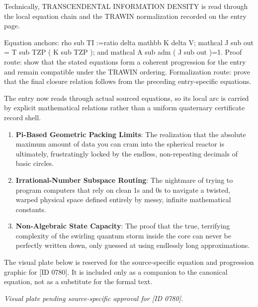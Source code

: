 Technically, TRANSCENDENTAL INFORMATION DENSITY is read through the local equation chain and the TRAWIN normalization recorded on the entry page.

Equation anchors: rho sub TI :=ratio delta mathbb K delta V; mathcal J sub out = T sub TZP ( K sub TZP ); and mathcal A sub adm ( J sub out )=1. Proof route: show that the stated equations form a coherent progression for the entry and remain compatible under the TRAWIN ordering. Formalization route: prove that the final closure relation follows from the preceding entry-specific equations.

The entry now reads through actual sourced equations, so its local arc is carried by explicit mathematical relations rather than a uniform quaternary certificate record shell.
\endgroup

\begin{enumerate}[leftmargin=1.6em,itemsep=6pt,topsep=4pt]
\item \textbf{Pi-Based Geometric Packing Limits}: The realization that the absolute maximum amount of data you can cram into the spherical reactor is ultimately, frustratingly locked by the endless, non-repeating decimals of basic circles.
\item \textbf{Irrational-Number Subspace Routing}: The nightmare of trying to program computers that rely on clean 1s and 0s to navigate a twisted, warped physical space defined entirely by messy, infinite mathematical constants.
\item \textbf{Non-Algebraic State Capacity}: The proof that the true, terrifying complexity of the swirling quantum storm inside the core can never be perfectly written down, only guessed at using endlessly long approximations.
\end{enumerate}

\begingroup\footnotesize\sloppy
The visual plate below is reserved for the source-specific equation and progression graphic for [ID 0780]. It is included only as a companion to the canonical equation, not as a substitute for the formal text.
\par\endgroup
\begingroup\footnotesize\itshape
Visual plate pending source-specific approval for [ID 0780].
\par\endgroup

